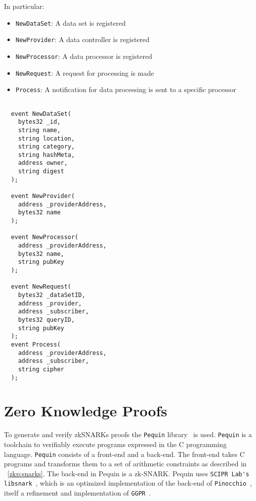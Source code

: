 In particular:

\begin{itemize}
  \item \verb|NewDataSet|: A data set is registered
  \item \verb|NewProvider|: A data controller is registered
  \item \verb|NewProcessor|: A data processor is registered
  \item \verb|NewRequest|: A request for processing is made
  \item \verb|Process|: A notification for data processing is sent to a specific processor
\end{itemize}

\begin{lstlisting}[language=Solidity, caption={Data sharing application events}]

  event NewDataSet(
    bytes32 _id,
    string name,
    string location,
    string category,
    string hashMeta,
    address owner,
    string digest
  );

  event NewProvider(
    address _providerAddress,
    bytes32 name
  );

  event NewProcessor(
    address _providerAddress,
    bytes32 name,
    string pubKey
  );

  event NewRequest(
    bytes32 _dataSetID,
    address _provider,
    address _subscriber,
    bytes32 queryID,
    string pubKey
  );
  event Process(
    address _providerAddress,
    address _subscriber,
    string cipher
  );
\end{lstlisting}

\section{Zero Knowledge Proofs}
\label{implemenation:zkp}

To generate and verify zkSNARKs proofs the \verb|Pequin| library~\cite{pequin} is used. \verb|Pequin| is a toolchain to verifiably execute programs expressed in the C programming language. \verb|Pequin| consists of a front-end and a back-end. The front-end takes C programs and transforms them to a set of arithmetic constraints as described in ~\ref{zkp:snarks}. The back-end in Pequin is a zk-SNARK. Pequin uses \verb|SCIPR Lab's libsnark|~\cite{libsnark}, which is an optimized implementation of the back-end of \verb|Pinocchio|~\cite{pinocchio-nearly-practical-verifiable-computation}, itself a refinement and implementation of \verb|GGPR|~\cite{ggpr}.

